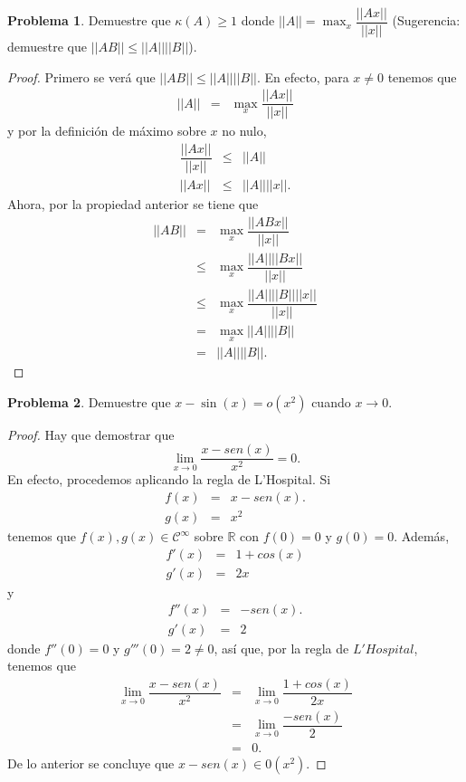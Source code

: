 \documentclass[12pt,letterpaper]{article}
\theoremstyle{definition}
\newtheorem{problm}{Problema}
\begin{document}
\begin{problm}
	Demuestre que $ \kappa(A) \geq 1 $ donde $ || A || = \max_{x} \dfrac{||Ax||}{||x||} $ (Sugerencia: demuestre que $ || AB || \leq || A || || B || $).
	\\
	\begin{proof}
		Primero se verá que $ || AB || \leq || A || || B || $. En efecto, para $ x\neq 0 $ tenemos que
		\begin{eqnarray*}
			|| A || & = & \max_{x} \dfrac{|| Ax ||}{|| x ||}
		\end{eqnarray*}
	y por la definición de máximo sobre $ x $ no nulo,
	\begin{eqnarray*}
		\dfrac{|| A x || }{|| x ||} & \leq  & || A || \\
		|| A x || & \leq & || A || ||x ||.
	\end{eqnarray*}
	Ahora, por la propiedad anterior se tiene que
	\begin{eqnarray*}
		|| A B || & = & \max_{x} \dfrac{|| A B x || }{|| x || } \\
		          & \leq & \max_{x} \dfrac{|| A || || B x || }{|| x ||} \\
		          & \leq & \max_{x} \dfrac{|| A || || B || ||x || }{|| x ||} \\
		          & = & \max_{x} || A || || B || \\
		          & = & || A || || B ||.		          
	\end{eqnarray*}
	\end{proof}
\end{problm}

\begin{problm}
	Demuestre que $ x - \sin(x) = o(x^2) $ cuando $ x \to 0 $.
	\\
	\begin{proof}
		Hay que demostrar que 
		\[ \lim_{x \to 0} \dfrac{x - sen(x) }{x^2} = 0. \]
		En efecto, procedemos aplicando la regla de L'Hospital. Si
		\begin{eqnarray*}
			f(x) & = & x - sen(x).\\
			g(x) & = & x^2
		\end{eqnarray*}
		tenemos que $ f(x), g(x) \in\mathcal{C}^{\infty} $ sobre $ \mathbb{R} $ con $ f(0)  = 0$ y $ g(0) = 0 $. Además,
		\begin{eqnarray*}
			f'(x) & = & 1 + cos(x)\\
			g'(x) & = & 2x
		\end{eqnarray*}
		y
		\begin{eqnarray*}
			f''(x) & = & -sen(x).\\
			g'(x) & = & 2
		\end{eqnarray*}
		donde $ f''(0) = 0 $ y $ g'''(0)  = 2 \neq 0 $, así que, por la regla de $ L'Hospital $, tenemos que
		\begin{eqnarray*}
			\lim_{x \to 0} \dfrac{x-sen(x)}{x^2} & = & \lim_{x \to 0} \dfrac{1+cos(x)}{2x} \\
												 & = & \lim_{x \to 0} \dfrac{-sen(x)}{2} \\
												 & = & 0.
		\end{eqnarray*}
	De lo anterior se concluye que $ x-sen(x) \in 0(x^2) $.
	\end{proof}
\end{problm}
\end{document}
